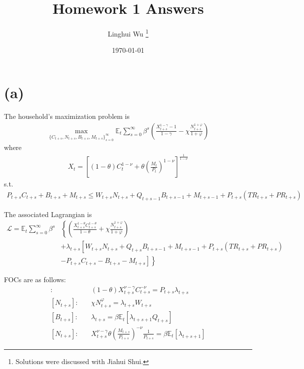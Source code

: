 \documentclass[12pt]{article}
\title{
Homework 1 Answers
}
\author{Linghui Wu
\thanks{Solutions were discussed with Jiahui Shui.}
}
\date{\today}
\begin{document}
\maketitle

\section*{(a)}

The household's maximization problem is
\begin{align*}
\max_{\{C_{t+s}, N_{t+s}, B_{t+s}, M_{t+s}\}^{\infty}_{s=0}} 
\mathbb{E}_t \sum_{s=0}^\infty \beta^s 
\left(\frac{X_{t+s}^{1-\gamma}-1}{1-\gamma} 
- \chi \frac{N_{t+s}^{1+\varphi}}{1+\varphi} \right)
\end{align*}
where
\begin{align*}
X_t = \left[ (1-\theta)C_t^{1-\nu} 
+ \theta \left(\frac{M_t}{P_t} \right)^{1-\nu} \right]^{\frac{1}{1-\nu}}
\end{align*}
s.t.
\begin{align*}
P_{t+s} C_{t+s} + B_{t+s} + M_{t+s} \leq 
W_{t+s}N_{t+s} + Q_{t+s-1}B_{t+s-1} + M_{t+s-1} + P_{t+s} (TR_{t+s}+PR_{t+s})
\end{align*}


The associated Lagrangian is
\begin{align*}
\mathcal{L} = \mathbb{E}_t \sum_{s=0}^\infty \beta^{s} 
&\left\{ \left(\frac{X_{t+s}^{1-\theta}C_{t+s}^{1-\theta}}{1-\theta} 
+ \chi \frac{N_{t+s}^{1+\varphi}}{1+\varphi} \right) \right. \\
&+ \left. \lambda_{t+s} \left[ W_{t+s} N_{t+s} + Q_{t+s} B_{t+s-1} + M_{t+s-1} 
+ P_{t+s} (TR_{t+s} + PR_{t+s}) \right. \right. \\
&- \left. \left. P_{t+s} C_{t+s} - B_{t+s} - M_{t+s} \right] \right\}
\end{align*}


FOCs are as follows:
\begin{align*}
[C_{t+s}]: &\quad (1-\theta)X_{t+s}^{\nu-\gamma}C_{t+s}^{-\nu} = P_{t+s}\lambda_{t+s} \\
[N_{t+s}]: &\quad \chi N_{t+s}^{\varphi} = \lambda_{t+s} W_{t+s} \\
[B_{t+s}]: &\quad \lambda_{t+s} = \beta \mathbb{E}_t \left[ \lambda_{t+s+1} Q_{t+s} \right] \\
[N_{t+s}]: &\quad X_{t+s}^{\nu-\gamma} \theta \left(\frac{M_{t+s}}{P_{t+s}} \right)^{-\nu} \frac{1}{P_{t+s}} = \beta \mathbb{E}_t \left[\lambda_{t+s+1}\right]
\end{align*}
\end{document}
